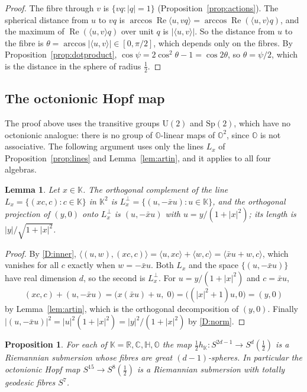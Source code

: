 \documentclass[11pt]{amsart}
\numberwithin{equation}{section}
\theoremstyle{plain}
\newtheorem{proposition}[theorem]{Proposition}
\newtheorem{lemma}[theorem]{Lemma}
\theoremstyle{definition}
\theoremstyle{remark}
\newcommand{\R}{\mathbb{R}}
\newcommand{\C}{\mathbb{C}}
\newcommand{\Hq}{\mathbb{H}}
\newcommand{\Oc}{\mathbb{O}}
\newcommand{\K}{\mathbb{K}}
\newcommand{\Sp}{\mathrm{Sp}}
\newcommand{\U}{\mathrm{U}}
\renewcommand{\Re}{\operatorname{Re}}
\begin{document}
\begin{proof}
The fibre through $v$ is $\{vq:|q|=1\}$ (Proposition~\ref{prop:actions}). The spherical distance from $u$ to $vq$ is $\arccos\Re\langle u,vq\rangle=\arccos\Re(\langle u,v\rangle q)$, and the maximum of $\Re(\langle u,v\rangle q)$ over unit $q$ is $|\langle u,v\rangle|$. So the distance from $u$ to the fibre is $\theta=\arccos|\langle u,v\rangle|\in[0,\pi/2]$, which depends only on the fibres. By Proposition~\ref{prop:dotproduct}, $\cos\psi=2\cos^2\theta-1=\cos2\theta$, so $\theta=\psi/2$, which is the distance in the sphere of radius $\frac12$.
\end{proof}

\subsection{The octonionic Hopf map}\label{sec:octsubmersion}

The proof above uses the transitive groups $\U(2)$ and $\Sp(2)$, which have no octonionic analogue: there is no group of $\Oc$-linear maps of $\Oc^2$, since $\Oc$ is not associative. The following argument uses only the lines $L_x$ of Proposition~\ref{prop:lines} and Lemma~\ref{lem:artin}, and it applies to all four algebras.

\begin{lemma}\label{lem:lineperp}
Let $x\in\K$. The orthogonal complement of the line $L_x=\{(xc,c):c\in\K\}$ in $\K^2$ is $L_x^\perp=\{(u,-\bar xu):u\in\K\}$, and the orthogonal projection of $(y,0)$ onto $L_x^\perp$ is $(u,-\bar xu)$ with $u=y/(1+|x|^2)$; its length is $|y|/\sqrt{1+|x|^2}$.
\end{lemma}

\begin{proof}
By \ref{D:inner}, $\langle(u,w),(xc,c)\rangle=\langle u,xc\rangle+\langle w,c\rangle=\langle\bar xu+w,c\rangle$, which vanishes for all $c$ exactly when $w=-\bar xu$. Both $L_x$ and the space $\{(u,-\bar xu)\}$ have real dimension $d$, so the second is $L_x^\perp$. For $u=y/(1+|x|^2)$ and $c=\bar xu$,
\[
(xc,c)+(u,-\bar xu)=\bigl(x(\bar xu)+u,\;0\bigr)=\bigl((|x|^2+1)u,0\bigr)=(y,0)
\]
by Lemma~\ref{lem:artin}, which is the orthogonal decomposition of $(y,0)$. Finally $|(u,-\bar xu)|^2=|u|^2(1+|x|^2)=|y|^2/(1+|x|^2)$ by \ref{D:norm}.
\end{proof}

\begin{proposition}\label{prop:octsubmersion}
For each of $\K=\R,\C,\Hq,\Oc$ the map $\tfrac12h_\K\colon S^{2d-1}\to S^d(\tfrac12)$ is a Riemannian submersion whose fibres are great $(d-1)$-spheres. In particular the octonionic Hopf map $S^{15}\to S^8(\tfrac12)$ is a Riemannian submersion with totally geodesic fibres $S^7$.
\end{proposition}
\end{document}
